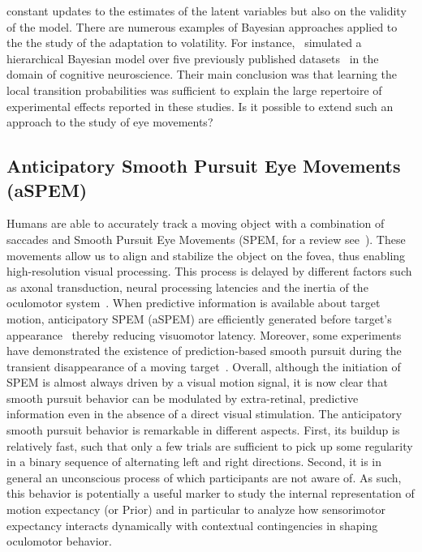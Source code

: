 \documentclass[12pt,english]{article}%
\newcommand{\citep}[1]{\parencite{#1}}
\newcommand{\citet}[1]{\textcite{#1}}
\begin{document}
constant updates to the estimates of the latent variables 
but also on the validity of the model.
%
There are numerous examples of Bayesian approaches
applied to the the study of the adaptation to volatility.
For instance,~\citet{Meyniel16} simulated a hierarchical Bayesian model
over five previously published datasets~\citep{Squires1976, Huettel2002, Kolossa2013, Cho2002, Falk1997} in the domain of cognitive neuroscience.
Their main conclusion was that
learning the local transition probabilities
was sufficient to explain the large repertoire
of experimental effects reported in these studies.
%
Is it possible to extend such an approach to the study of eye movements?
\subsection{Anticipatory Smooth Pursuit Eye Movements (aSPEM)}
Humans are able to accurately track a moving object
with a combination of saccades and
Smooth Pursuit Eye Movements (SPEM, for a review see~\citet{Krauzlis2008}).
These movements allow us to align and
stabilize the object on the fovea,
thus enabling high-resolution visual processing.
This process is delayed by different factors such as axonal transduction,
neural processing latencies and the inertia of the oculomotor system~\citep{Krauzlis89}.
When predictive information is available about target motion,
anticipatory SPEM (aSPEM) are
efficiently generated before target's appearance~\citep{Westheimer1954, Kowler1979a, Kowler1979b} thereby reducing visuomotor latency.
Moreover, some experiments have demonstrated the existence
of prediction-based smooth pursuit during
the transient disappearance of a moving target~\citep{Badler2006,BeckerFuchs1985}.
Overall, although the initiation of SPEM is almost always driven by a visual motion signal, it is now clear that smooth pursuit behavior
can be modulated by extra-retinal, predictive information even in the absence of a direct visual stimulation.
The anticipatory smooth pursuit behavior is remarkable
in different aspects.
First, its buildup is relatively fast, such that only a few trials are sufficient
to pick up some regularity in a binary sequence of alternating left and right directions.
Second, it is in general an unconscious process
of which participants are not aware of.
As such, this behavior is potentially a useful marker
to study the internal representation of motion expectancy (or Prior) 
and in particular to analyze how sensorimotor expectancy 
interacts dynamically with contextual contingencies in shaping oculomotor behavior.
\end{document}
